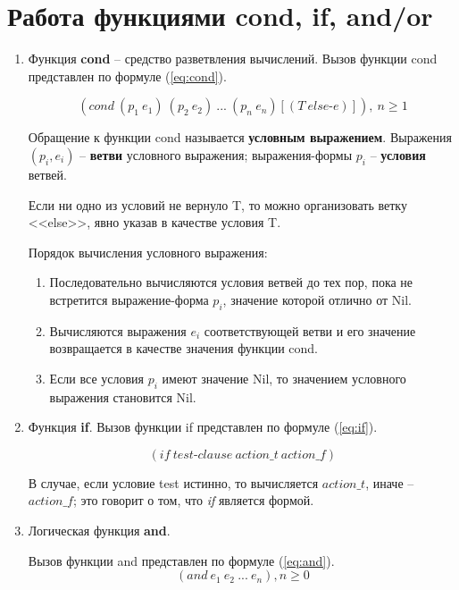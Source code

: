 \section{Работа функциями cond, if, and/or}
\begin{enumerate}
	
\item Функция \textbf{cond} -- средство разветвления вычислений.
Вызов функции cond представлен по формуле (\ref{eq:cond}).

\begin{equation}
	\label{eq:cond}
	(cond\ (p_1\ e_1)\ (p_2\ e_2)\ ...\ (p_n\ e_n) [(T\ else\text{-}e)]),\ n \geq 1
\end{equation}

Обращение к функции cond называется \textbf{условным выражением}. Выражения $(p_i, e_i)$ -- \textbf{ветви} условного выражения; выражения-формы $p_i$ -- \textbf{условия} ветвей.

Если ни одно из условий не вернуло T, то можно организовать ветку <<else>>, явно указав в качестве условия T.

Порядок вычисления условного выражения:
\begin{enumerate}
	\item Последовательно вычисляются условия ветвей до тех пор, пока не встретится выражение-форма $p_i$, значение которой отлично от Nil.
	\item Вычисляются выражения $e_i$ соответствующей ветви и его значение возвращается в качестве значения функции cond.
	\item Если все условия $p_i$ имеют значение Nil, то значением условного выражения становится Nil.
\end{enumerate}

\item Функция \textbf{if}. Вызов функции if представлен по формуле (\ref{eq:if}).

 \begin{equation}
 	\label{eq:if}
 	(if\ test\text{-}clause\ action\_t\ action\_f)
 \end{equation}

В случае, если условие test истинно, то вычисляется $action\_t$, иначе -- $action\_f$; это говорит о том, что \textit{if} является формой. 

\item Логическая функция \textbf{and}. 

Вызов функции and представлен по формуле (\ref{eq:and}).
\begin{equation}
	\label{eq:and}
	(and\ e_1\ e_2\ ...\ e_n), n \geq 0
\end{equation}


\end{enumerate}
